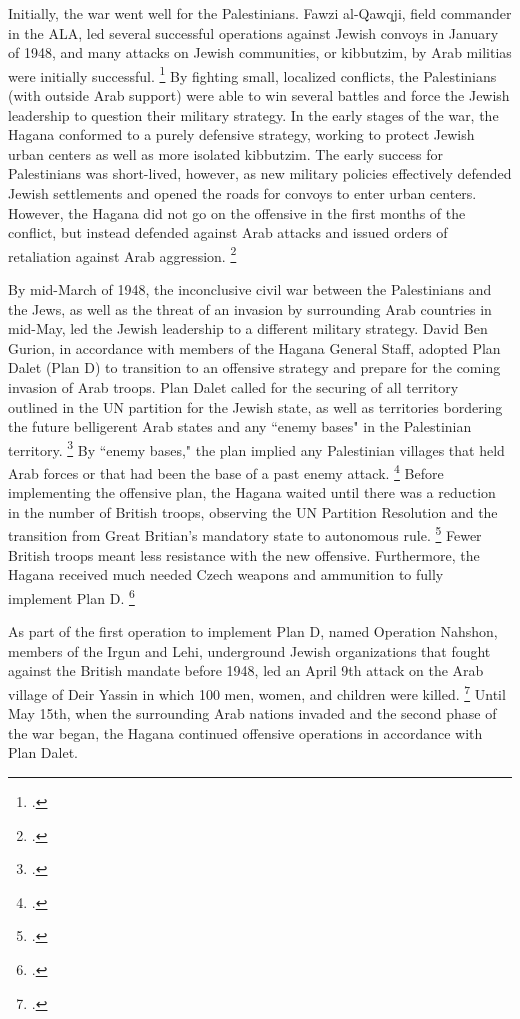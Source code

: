 \documentclass[11pt]{turabian-researchpaper}
\begin{document}
Initially, the war went well for the Palestinians.  Fawzi al-Qawqji, field commander in the ALA, led several successful operations against Jewish convoys in January of 1948, and many attacks on Jewish communities, or kibbutzim, by Arab militias were initially successful.
\footcite[][79]{pappe}
By fighting small, localized conflicts, the Palestinians (with outside Arab support) were able to win several battles and force the Jewish leadership to question their military strategy.  In the early stages of the war, the Hagana conformed to a purely defensive strategy, working to protect Jewish urban centers as well as more isolated kibbutzim.  The early success for Palestinians was short-lived, however, as new military policies effectively defended Jewish settlements and opened the roads for convoys to enter urban centers.  However, the Hagana did not go on the offensive in the first months of the conflict, but instead defended against Arab attacks and issued orders of retaliation against Arab aggression.
\footcite[][68]{tal}



By mid-March of 1948, the inconclusive civil war between the Palestinians and the Jews, as well as the threat of an invasion by surrounding Arab countries in mid-May, led the Jewish leadership to a different military strategy.  David Ben Gurion, in accordance with members of the Hagana General Staff, adopted Plan Dalet (Plan D) to transition to an offensive strategy and prepare for the coming invasion of Arab troops.  Plan Dalet called for the securing of all territory outlined in the UN partition for the Jewish state, as well as territories bordering the future belligerent Arab states and any ``enemy bases" in the Palestinian territory.
\footcite{khalidi}
By ``enemy bases," the plan implied any Palestinian villages that held Arab forces or that had been the base of a past enemy attack.
\footcite[][119]{morris}
Before implementing the offensive plan, the Hagana waited until there was a reduction in the number of British troops, observing the UN Partition Resolution and the transition from Great Britian's mandatory state to autonomous rule.
\footcite[][32]{herzog}
Fewer British troops meant less resistance with the new offensive.  Furthermore, the Hagana received much needed Czech weapons and ammunition to fully implement Plan D.
\footcite[][116]{morris}



As part of the first operation to implement Plan D, named Operation Nahshon, members of the Irgun and Lehi, underground Jewish organizations that fought against the British mandate before 1948, led an April 9th attack on the Arab village of Deir Yassin in which 100 men, women, and children were killed.
\footcite{nabka}
Until May 15th, when the surrounding Arab nations invaded and the second phase of the war began, the Hagana continued offensive operations in accordance with Plan Dalet.
\end{document}
